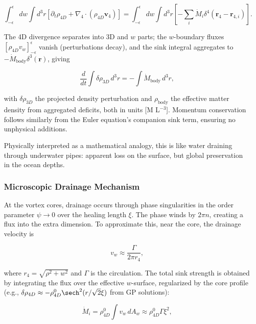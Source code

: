 \[
\int_{-\epsilon}^{\epsilon} dw \int d^3 r \left[ \partial_t \rho_{4D} + \nabla_4 \cdot (\rho_{4D} \mathbf{v}_4) \right] = \int_{-\epsilon}^{\epsilon} dw \int d^3 r \left[ -\sum_i \dot{M}_i \delta^4(\mathbf{r}_4 - \mathbf{r}_{4,i}) \right].
\]

The 4D divergence separates into 3D and $w$ parts; the $w$-boundary fluxes $[\rho_{4D} v_w]_{-\epsilon}^{\epsilon}$ vanish (perturbations decay), and the sink integral aggregates to $-\dot{M}_{\text{body}} \delta^3(\mathbf{r})$, giving

\begin{equation}
\frac{d}{dt} \int \delta \rho_{3D} \, d^3 r = -\int \dot{M}_{\text{body}} \, d^3 r,
\end{equation}

with $\delta \rho_{3D}$ the projected density perturbation and $\rho_{\text{body}}$ the effective matter density from aggregated deficits, both in units [M L$^{-3}$]. Momentum conservation follows similarly from the Euler equation's companion sink term, ensuring no unphysical additions.

Physically interpreted as a mathematical analogy, this is like water draining through underwater pipes: apparent loss on the surface, but global preservation in the ocean depths.

\subsubsection{Microscopic Drainage Mechanism}
At the vortex cores, drainage occurs through phase singularities in the order parameter $\psi \to 0$ over the healing length $\xi$. The phase winds by $2\pi n$, creating a flux into the extra dimension. To approximate this, near the core, the drainage velocity is

\begin{equation}
v_w \approx \frac{\Gamma}{2\pi r_4},
\end{equation}

where $r_4 = \sqrt{\rho^2 + w^2}$ and $\Gamma$ is the circulation. The total sink strength is obtained by integrating the flux over the effective $w$-surface, regularized by the core profile (e.g., $\delta \rho_{4D} \approx -\rho_{4D}^0 \sech^2(r / \sqrt{2} \xi)$ from GP solutions):

\begin{equation}
\dot{M}_i = \rho_{4D}^0 \int v_w \, dA_w \approx \rho_{4D}^0 \Gamma \xi^2,
\end{equation}

